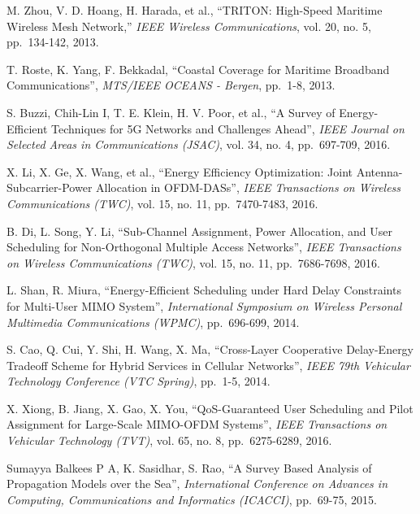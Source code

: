 \documentclass{ieeeaccess}
\begin{document}
\begin{thebibliography}{10}

M. Zhou, V. D. Hoang, H. Harada, et al., ``TRITON: High-Speed Maritime Wireless Mesh Network,''
\emph{IEEE Wireless Communications}, vol. 20, no. 5, pp.~134-142, 2013.

T. Roste, K. Yang, F. Bekkadal, ``Coastal Coverage for Maritime Broadband Communications'',
\emph{MTS/IEEE OCEANS - Bergen}, pp.~1-8, 2013.

S. Buzzi, Chih-Lin I, T. E. Klein, H. V. Poor, et al., ``A Survey of Energy-Efficient Techniques for 5G Networks and Challenges Ahead'',
\emph{IEEE Journal on Selected Areas in Communications (JSAC)}, vol. 34, no. 4, pp.~697-709, 2016.

X. Li, X. Ge, X. Wang, et al., ``Energy Efficiency Optimization: Joint Antenna-Subcarrier-Power Allocation in OFDM-DASs'',
\emph{IEEE Transactions on Wireless Communications (TWC)}, vol. 15, no. 11, pp.~7470-7483, 2016.

B. Di, L. Song, Y. Li, ``Sub-Channel Assignment, Power Allocation, and User Scheduling for Non-Orthogonal Multiple Access Networks'',
\emph{IEEE Transactions on Wireless Communications (TWC)}, vol. 15, no. 11, pp.~7686-7698, 2016.

L. Shan, R. Miura, ``Energy-Efficient Scheduling under Hard Delay Constraints for Multi-User MIMO System'',
\emph{International Symposium on Wireless Personal Multimedia Communications (WPMC)}, pp.~696-699, 2014.

S. Cao, Q. Cui, Y. Shi, H. Wang, X. Ma, ``Cross-Layer Cooperative Delay-Energy Tradeoff Scheme for Hybrid Services in Cellular Networks'',
\emph{IEEE 79th Vehicular Technology Conference (VTC Spring)}, pp.~1-5, 2014.

X. Xiong, B. Jiang, X. Gao, X. You, ``QoS-Guaranteed User Scheduling and Pilot Assignment for Large-Scale MIMO-OFDM Systems'',
\emph{IEEE Transactions on Vehicular Technology (TVT)}, vol. 65, no. 8, pp.~6275-6289, 2016.


Sumayya Balkees P A, K. Sasidhar, S. Rao, ``A Survey Based Analysis of Propagation Models over the Sea'',
\emph{International Conference on Advances in Computing, Communications and Informatics (ICACCI)}, pp.~69-75, 2015.


\end{thebibliography}
\end{document}
